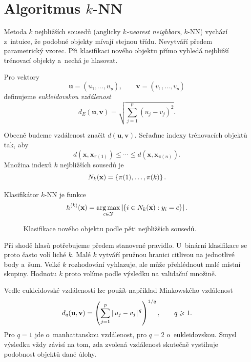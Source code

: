 \section{Algoritmus \(k\)-NN}\label{sec:ai-knn}

Metoda \(k\) nejbližších sousedů (anglicky \emph{\(k\)-nearest neighbors}, \(k\)-NN) vychází z~intuice, že podobné objekty mívají stejnou třídu. Nevytváří předem parametrický vzorec. Při klasifikaci nového objektu přímo vyhledá nejbližší trénovací objekty a~nechá je hlasovat.

\begin{definition}\label{def:ai-eukleidovska-vzdalenost}
    Pro vektory
    \[
        \mathbf{u}=(u_1,\ldots,u_p),
        \qquad
        \mathbf{v}=(v_1,\ldots,v_p)
    \]
    definujeme \emph{eukleidovskou vzdálenost}
    \[
        d_E(\mathbf{u},\mathbf{v})
        =
        \sqrt{
            \sum_{j=1}^{p}(u_j-v_j)^2
        }.
    \]
\end{definition}

Obecně budeme vzdálenost značit \(d(\mathbf{u},\mathbf{v})\). Seřaďme indexy trénovacích objektů tak, aby
\[
    d(\mathbf{x},\mathbf{x}_{\pi(1)})
    \leqslant
    \cdots
    \leqslant
    d(\mathbf{x},\mathbf{x}_{\pi(n)}).
\]
Množina indexů \(k\) nejbližších sousedů je
\[
    N_k(\mathbf{x})
    =
    \left\{\pi(1),\ldots,\pi(k)\right\}.
\]

\begin{definition}\label{def:ai-knn}
    Klasifikátor \(k\)-NN je funkce
    \[
        h^{(k)}(\mathbf{x})
        =
        \operatorname*{arg\,max}_{c\in\mathcal{Y}}
        \left| 
            \left\{
                i\in N_k(\mathbf{x}):y_i=c
            \right\}
         \right|.
    \]
\end{definition}

\begin{figure}[ht]
    \centering
    
    \caption{Klasifikace nového objektu podle pěti nejbližších sousedů.}
    \label{fig:ai-knn}
\end{figure}

Při shodě hlasů potřebujeme předem stanovené pravidlo. U~binární klasifikace se proto často volí liché \(k\). Malé \(k\) vytváří pružnou hranici citlivou na jednotlivé body a~šum. Velké \(k\) rozhodování vyhlazuje, ale může přehlédnout malé místní skupiny. Hodnotu \(k\) proto volíme podle výsledku na validační množině.

Vedle eukleidovské vzdálenosti lze použít například Minkowského vzdálenost
\[
    d_q(\mathbf{u},\mathbf{v})
    =
    \left(
        \sum_{j=1}^{p}
        \left|\,u_j-v_j\,\right|^q
    \right)^{1/q},
    \qquad q\geqslant1.
\]
Pro \(q=1\) jde o~manhattanskou vzdálenost, pro \(q=2\) o~eukleidovskou. Smysl výsledku vždy závisí na tom, zda zvolená vzdálenost skutečně vystihuje podobnost objektů dané úlohy.

